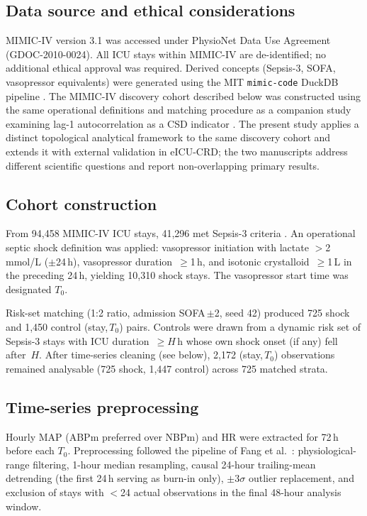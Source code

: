 \documentclass[12pt,a4paper]{article}
\begin{document}
\subsection{Data source and ethical considerations}
MIMIC-IV version 3.1 \cite{johnson2023} was accessed under PhysioNet Data
Use Agreement (GDOC-2010-0024).
All ICU stays within MIMIC-IV are de-identified; no additional ethical approval
was required.
Derived concepts (Sepsis-3, SOFA, vasopressor equivalents) were generated
using the MIT \texttt{mimic-code} DuckDB pipeline \cite{johnson2023}.
The MIMIC-IV discovery cohort described below was constructed using the same
operational definitions and matching procedure as a companion study examining
lag-1 autocorrelation as a CSD indicator \cite{fang2026}.
The present study applies a distinct topological analytical framework to the
same discovery cohort and extends it with external validation in eICU-CRD;
the two manuscripts address different scientific questions and report
non-overlapping primary results.

\subsection{Cohort construction}
\label{sec:cohort}

From 94,458 MIMIC-IV ICU stays, 41,296 met Sepsis-3 criteria
\cite{singer2016}.
An operational septic shock definition was applied:
vasopressor initiation with lactate $>$2\,mmol/L ($\pm$24\,h),
vasopressor duration~$\geq$1\,h, and isotonic crystalloid~$\geq$1\,L in the
preceding 24\,h, yielding 10,310 shock stays.
The vasopressor start time was designated $T_0$.

Risk-set matching (1:2 ratio, admission SOFA\,$\pm$2, seed 42) produced 725
shock and 1,450 control (stay,\,$T_0$) pairs.
Controls were drawn from a dynamic risk set of Sepsis-3 stays with
ICU duration~$\geq H$\,h whose own shock onset (if any) fell after~$H$.
After time-series cleaning (see below), 2,172 (stay,\,$T_0$) observations
remained analysable (725 shock, 1,447 control) across 725 matched strata.

\subsection{Time-series preprocessing}
Hourly MAP (ABPm preferred over NBPm) and HR were extracted for
72\,h before each $T_0$.
Preprocessing followed the pipeline of Fang et al.\ \cite{fang2026}:
physiological-range filtering, 1-hour median resampling, causal 24-hour
trailing-mean detrending (the first 24\,h serving as burn-in only),
$\pm3\sigma$ outlier replacement, and exclusion of stays with
$<$24 actual observations in the final 48-hour analysis window.
\end{document}
